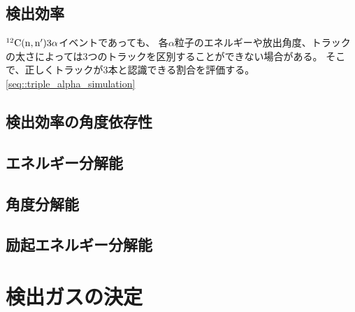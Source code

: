 \documentclass[../master]{subfiles}
\begin{document}
\subsection{検出効率}
${}^{12}{\rm C}({\rm n},{\rm n}')3\alpha$イベントであっても、
各$\alpha$粒子のエネルギーや放出角度、トラックの太さによっては3つのトラックを区別することができない場合がある。
そこで、正しくトラックが3本と認識できる割合を評価する。
\ref{seq::triple_alpha_simulation}

\subsection{検出効率の角度依存性}
\subsection{エネルギー分解能}
\subsection{角度分解能}
\subsection{励起エネルギー分解能}

\section{検出ガスの決定}
\end{document}
